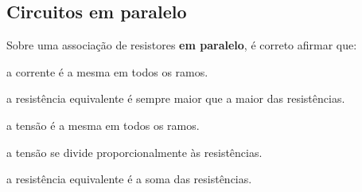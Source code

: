 
\subsection{Circuitos em paralelo}

\blocofixacao

\begin{questao}[1]{}
Sobre uma associação de resistores \textbf{em paralelo}, é correto afirmar que:
\begin{alternativas}
\item a corrente é a mesma em todos os ramos.
\item a resistência equivalente é sempre maior que a maior das resistências.
\item a tensão é a mesma em todos os ramos.
\item a tensão se divide proporcionalmente às resistências.
\item a resistência equivalente é a soma das resistências.
\end{alternativas}
\end{questao}


